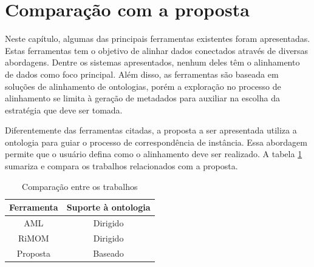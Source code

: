 \section{Comparação com a proposta}

Neste capítulo, algumas das principais ferramentas existentes foram apresentadas. Estas ferramentas tem o objetivo de alinhar dados conectados através de diversas abordagens. Dentre os sistemas apresentados, nenhum deles têm o alinhamento de dados como foco principal. Além disso, as ferramentas são baseada em soluções de alinhamento de ontologias, porém a exploração no processo de alinhamento se limita à geração de metadados para auxiliar na escolha da estratégia que deve ser tomada. 

Diferentemente das ferramentas citadas, a proposta a ser apresentada utiliza a ontologia para guiar o processo de correspondência de instância. Essa abordagem permite que o usuário defina como o alinhamento deve ser realizado. A tabela \ref{tab:comparacao} sumariza e compara os trabalhos relacionados com a proposta.

\begin{table}[h]
\centering
\caption{Comparação entre os trabalhos}
\label{tab:comparacao}
\begin{tabular}{@{}cc}
\toprule
Ferramenta 	& Suporte à ontologia \\ \midrule
AML			& Dirigido            \\
RiMOM		& Dirigido            \\
Proposta	& Baseado             \\ \midrule
\end{tabular}
\end{table}
